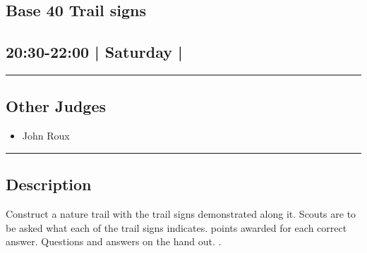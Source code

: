 \documentclass[10pt, A5]{article}
\begin{document}
		\begin{framed}
			\begin{minipage}{\textwidth}

			\setcounter{section}{82}
							\section{\faStar \: Base 40 \faStar \: Trail signs}
						
			\subsection*{20:30-22:00 | Saturday | }

			\vspace{0.25cm}
			\hrule
			\vspace{0.25cm}


			\subsection*{Other Judges}
							

				\begin{multicols}{2}

			\begin{itemize}
											\item John Roux
								\end{itemize}

			\vfill\null
			\columnbreak

			\begin{itemize}
								\end{itemize}

			\vfill\null

			\end{multicols}

			\vspace{0.25cm}
			\hrule
			\vspace{0.25cm}

			\begin{minipage}{\textwidth}
			\subsection*{\faListAlt \: Description}
			Construct a nature trail with the trail signs demonstrated along it. Scouts are to be asked what each of the trail signs indicates. points awarded for each correct answer. Questions and answers on the hand out. .
			\end{minipage}


	\end{minipage}
	\end{framed}
\end{document}
